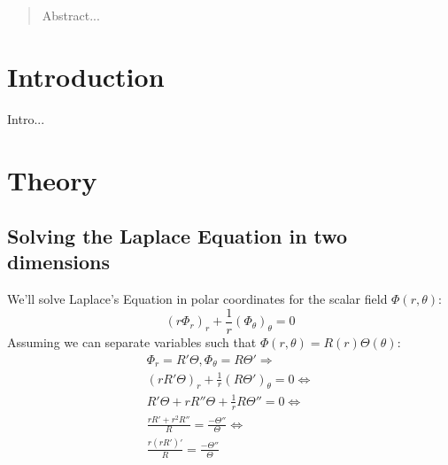 \documentclass[aps,twocolumn,pre,nofootinbib,10pt]{revtex4-1}
\begin{document}
\begin{abstract}

Abstract... 
  
\end{abstract}


\maketitle



\section{Introduction \label{sec:int}}

Intro...


 

\section{Theory \label{sec:the}}

\subsection{Solving the Laplace Equation in two dimensions}
We'll solve Laplace's Equation in polar coordinates for the scalar field $\Phi(r, \theta)$:
\[ \left( r \Phi_r \right)_r + \frac{1}{r} \left(\Phi_\theta \right)_\theta = 0 \]
Assuming we can separate variables such that $\Phi(r, \theta) = R(r)\Theta(\theta)$:
\begin{gather*}
 \Phi_r = R'\Theta, \Phi_\theta = R\Theta' \Rightarrow \\
 (rR'\Theta)_r + \frac{1}{r}(R\Theta')_\theta = 0 \Leftrightarrow \\
 R'\Theta + rR''\Theta + \frac{1}{r}R\Theta'' = 0 \Leftrightarrow \\
 \frac{rR' + r^2 R''}{R} = \frac{- \Theta''}{\Theta} \Leftrightarrow \\
 \frac{r(rR')'}{R} = \frac{- \Theta''}{\Theta}
\end{gather*}
\end{document}
